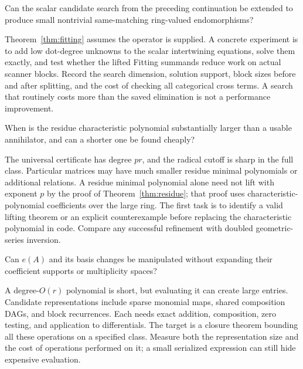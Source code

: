 \begin{question}
Can the scalar candidate search from the preceding continuation be extended
to produce small nontrivial same-matching ring-valued endomorphisms?
\end{question}

Theorem~\ref{thm:fitting} assumes the operator is supplied. A concrete
experiment is to add low dot-degree unknowns to the scalar intertwining
equations, solve them exactly, and test whether the lifted Fitting summands
reduce work on actual scanner blocks. Record the search dimension, solution
support, block sizes before and after splitting, and the cost of checking
all categorical cross terms. A search that routinely costs more than the
saved elimination is not a performance improvement.

\begin{question}
When is the residue characteristic polynomial substantially larger than a
usable annihilator, and can a shorter one be found cheaply?
\end{question}

The universal certificate has degree $pr$, and the radical cutoff is sharp
in the full class. Particular matrices may have much smaller residue
minimal polynomials or additional relations. A residue minimal polynomial
alone need not lift with exponent $p$ by the proof of
Theorem~\ref{thm:residue}; that proof uses characteristic-polynomial
coefficients over the large ring. The first task is to identify a valid
lifting theorem or an explicit counterexample before replacing the
characteristic polynomial in code. Compare any successful refinement with
doubled geometric-series inversion.

\begin{question}
Can $e(A)$ and its basis changes be manipulated without expanding their
coefficient supports or multiplicity spaces?
\end{question}

A degree-$O(r)$ polynomial is short, but evaluating it can create large
entries. Candidate representations include sparse monomial maps, shared
composition DAGs, and block recurrences. Each needs exact addition,
composition, zero testing, and application to differentials. The target
is a closure theorem bounding all these operations on a specified class.
Measure both the representation size and the cost of operations performed
on it; a small serialized expression can still hide expensive evaluation.

